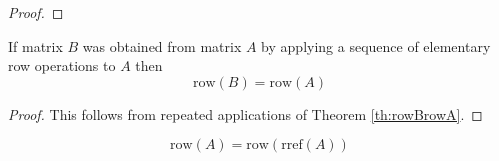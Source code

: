 \documentclass{ximera}
\begin{document}
\begin{proof}
  


\end{proof}

\begin{corollary}\label{cor:rowequiv}
If matrix $B$ was obtained from matrix $A$ by applying a sequence of elementary row operations to $A$ then
$$\mbox{row}(B)=\mbox{row}(A)$$
\end{corollary}
\begin{proof}
This follows from repeated applications of Theorem \ref{th:rowBrowA}.
\end{proof}
\begin{corollary}\label{cor:rowArowrrefA}
$$\mbox{row}(A)=\mbox{row}(\mbox{rref}(A))$$
\end{corollary}
\end{document}
